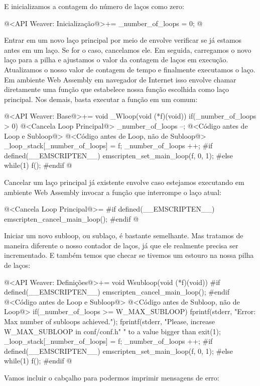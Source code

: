 E inicializamos a contagem do número de laços como zero:

\iniciocodigo
@<API Weaver: Inicialização@>+=
_number_of_loops = 0;
@
\fimcodigo

Entrar em um novo laço principal por meio de 
envolve verificar se já estamos antes em um laço. Se for o caso,
cancelamos ele. Em seguida, carregamos o novo laço para a pilha e
ajustamos o valor da contagem de laços em execução. Atualizamos o
nosso valor de contagem de tempo e finalmente executamos o laço. Em
ambiente Web Assembly em navegador de Internet isso envolve chamar
diretamente uma função que estabelece nossa função escolhida como laço
principal. Nos demais, basta executar a função em
um  comum:

\iniciocodigo
@<API Weaver: Base@>+=
void _Wloop(void (*f)(void)){
  if(_number_of_loops > 0){
    @<Cancela Loop Principal@>
    _number_of_loops --;
  }
  @<Código antes de Loop e Subloop@>
  @<Código antes de Loop, não de Subloop@>
  _loop_stack[_number_of_loops] = f;
  _number_of_loops ++;
#if defined(__EMSCRIPTEN__)
  emscripten_set_main_loop(f, 0, 1);
#else
  while(1)
    f();
#endif
}
@
\fimcodigo

Cancelar um laço principal já existente envolve caso estejamos
executando em ambiente Web Assembly invocar a função que interrompe o
laço atual:

\iniciocodigo
@<Cancela Loop Principal@>=
#if defined(__EMSCRIPTEN__)
emscripten_cancel_main_loop();
#endif
@
\fimcodigo

Iniciar um novo subloop, ou sublaço, é bastante semelhante. Mas
tratamos de maneira diferente o nosso contador de laços, já que ele
realmente precisa ser incrementado. E também temos que checar se
tivemos um estouro na nossa pilha de laços:

\iniciocodigo
@<API Weaver: Definições@>+=
void Wsubloop(void (*f)(void)){
#if defined(__EMSCRIPTEN__)
    emscripten_cancel_main_loop();
#endif
  @<Código antes de Loop e Subloop@>
  @<Código antes de Subloop, não de Loop@>
  if(_number_of_loops >= W_MAX_SUBLOOP){
    fprintf(stderr, "Error: Max number of subloops achieved.\n");
    fprintf(stderr, "Please, increase W_MAX_SUBLOOP in conf/conf.h"
            " to a value bigger than %
    exit(1);
  }
  _loop_stack[_number_of_loops] = f;
  _number_of_loops ++;
#if defined(__EMSCRIPTEN__)
  emscripten_set_main_loop(f, 0, 1);
#else
  while(1)
    f();
#endif
}
@
\fimcodigo

Vamos incluir o cabçalho para podermos imprimir mensagens de erro:

